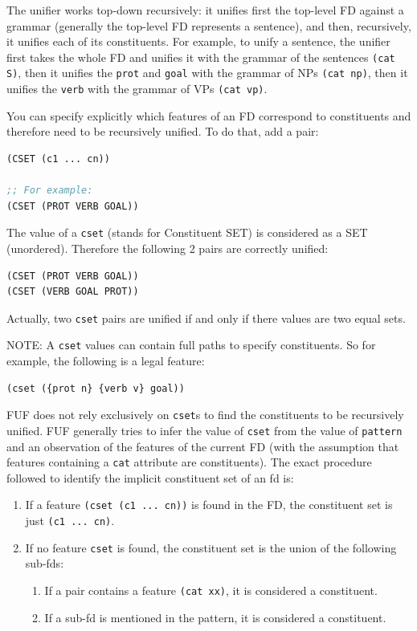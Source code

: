 \documentclass[10pt,a4paper]{report}
\begin{document}
The unifier works top-down recursively: it unifies first the top-level FD
against a grammar (generally the top-level FD represents a sentence), and
then, recursively, it unifies each of its constituents. For example, to
unify a sentence, the unifier first takes the whole FD and unifies it with
the grammar of the sentences {\tt (cat S)}, then it unifies the {\tt prot} and
{\tt goal} with the grammar of NPs {\tt (cat np)}, then it unifies the {\tt verb}
with the grammar of VPs {\tt (cat vp)}.
 

You can specify explicitly which features of an FD correspond to constituents
and therefore need to be recursively unified. To do that, add a pair:

\begin{lstlisting}[language=Lisp]
(CSET (c1 ... cn))

;; For example:
(CSET (PROT VERB GOAL))
\end{lstlisting}

The value of a {\tt cset} (stands for Constituent SET) is considered as a SET
(unordered). Therefore the following 2 pairs are correctly unified:

\begin{lstlisting}[language=Lisp]
(CSET (PROT VERB GOAL))
(CSET (VERB GOAL PROT))
\end{lstlisting}

Actually, two {\tt cset} pairs are unified if and only if there
values are two equal sets.

NOTE: A {\tt cset} values can contain full paths to specify constituents. So
for example, the following is a legal feature:

\begin{lstlisting}[language=Lisp]
(cset ({prot n} {verb v} goal))
\end{lstlisting}

FUF does not rely exclusively on {\tt cset}s to find the constituents to be
recursively unified. FUF generally tries to infer the value of {\tt cset} from
the value of {\tt pattern} and an observation of the features of the current
FD (with the assumption that features containing a {\tt cat} attribute are
constituents).  The exact procedure followed to identify the implicit
constituent set of an fd is:
\begin{enumerate}
\item If a feature {\tt (cset (c1 ... cn))} is found in the FD, the constituent set
is just {\tt (c1 ... cn)}.

\item If no feature {\tt cset} is found, the constituent set is the union of the
following sub-fds:
\begin{enumerate}
\item If a pair contains a feature {\tt (cat xx)}, it is considered a constituent.

\item If a sub-fd is mentioned in the pattern, it is considered a constituent.
\end{enumerate}
\end{enumerate}
\end{document}
